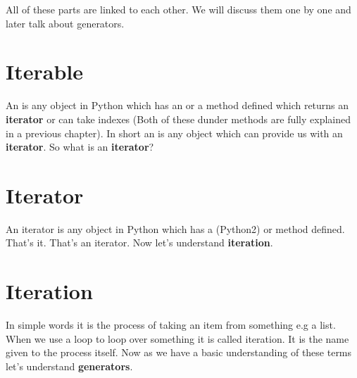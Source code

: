 \documentclass[a4paper,12pt,oneside]{sphinxmanual}
\begin{document}
All of these parts are linked to each other. We will discuss them one by
one and later talk about generators.


\section{Iterable}
\label{generators:iterable}
An  is any object in Python which has an  or a
 method defined which returns an \textbf{iterator} or can take
indexes (Both of these dunder methods are fully explained in a previous
chapter). In short an  is any object which can provide us
with an \textbf{iterator}. So what is an \textbf{iterator}?


\section{Iterator}
\label{generators:iterator}
An iterator is any object in Python which has a  (Python2) or
 method defined. That's it. That's an iterator. Now let's
understand \textbf{iteration}.


\section{Iteration}
\label{generators:iteration}
In simple words it is the process of taking an item from something e.g a
list. When we use a loop to loop over something it is called iteration.
It is the name given to the process itself. Now as we have a basic
understanding of these terms let's understand \textbf{generators}.
\end{document}
